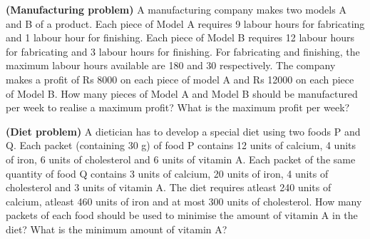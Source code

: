\item  \textbf{(Manufacturing problem)} A manufacturing company makes two models
A and B of a product. Each piece of Model A requires 9 labour hours for fabricating
and 1 labour hour for finishing. Each piece of Model B requires 12 labour hours for
fabricating and 3 labour hours for finishing. For fabricating and finishing, the maximum
labour hours available are 180 and 30 respectively. The company makes a profit of
Rs 8000 on each piece of model A and Rs 12000 on each piece of Model B. How many
pieces of Model A and Model B should be manufactured per week to realise a maximum
profit? What is the maximum profit per week?\\
\solution



\item \textbf {(Diet problem)} A dietician has to develop a special diet using two foods
P and Q. Each packet (containing 30 g) of food P contains 12 units of calcium, 4 units
of iron, 6 units of cholesterol and 6 units of vitamin A. Each packet of the same quantity
of food Q contains 3 units of calcium, 20 units of iron, 4 units of cholesterol and 3 units
of vitamin A. The diet requires atleast 240 units of calcium, atleast 460 units of iron and
at most 300 units of cholesterol. How many packets of each food should be used to
minimise the amount of vitamin A in the diet? What is the minimum amount of vitamin A?\\
\\
\solution


%
